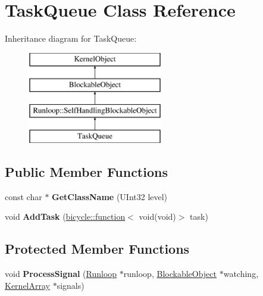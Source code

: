\hypertarget{class_task_queue}{}\section{Task\+Queue Class Reference}
\label{class_task_queue}
Inheritance diagram for Task\+Queue\+:\begin{figure}[H]
\begin{center}
\leavevmode
\includegraphics[height=4.000000cm]{class_task_queue}
\end{center}
\end{figure}
\subsection*{Public Member Functions}
\begin{DoxyCompactItemize}
\item 
\mbox{\label{class_task_queue_a0f434f7fa8352c71a02879006892cf5c}} 
const char $\ast$ {\bfseries Get\+Class\+Name} (U\+Int32 level)
\item 
\mbox{\label{class_task_queue_aacf10c589caf1c237fb13ecf5056f192}} 
void {\bfseries Add\+Task} (\hyperlink{classbicycle_1_1function}{bicycle\+::function}$<$ void(void)$>$ task)
\end{DoxyCompactItemize}
\subsection*{Protected Member Functions}
\begin{DoxyCompactItemize}
\item 
\mbox{\label{class_task_queue_a4a500c091ed25b94598a9b4cd5580f42}} 
void {\bfseries Process\+Signal} (\hyperlink{class_runloop}{Runloop} $\ast$runloop, \hyperlink{class_blockable_object}{Blockable\+Object} $\ast$watching, \hyperlink{class_kernel_array}{Kernel\+Array} $\ast$signals)
\end{DoxyCompactItemize}
